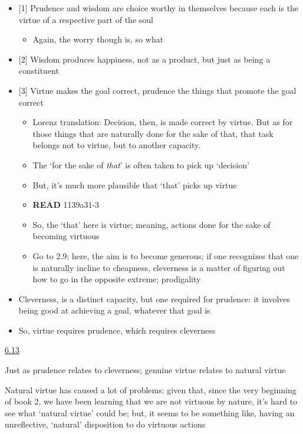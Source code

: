 \documentclass[11pt]{article}
\begin{document}
\begin{itemize}\item{[1] Prudence and wisdom are choice worthy in themselves because each is the virtue of a respective part of the soul}\begin{itemize}\item{Again, the worry though is, so what}\end{itemize}\item{[2] Wisdom produces happiness, not as a product, but just as being a constituent}\item{[3] Virtue makes the goal correct, prudence the things that promote the goal correct}\begin{itemize}\item{Lorenz translation: Decision, then, is made correct by virtue. But as for those things that are naturally done for the sake of that, that task belongs not to virtue, but to another capacity.}\item{The `for the sake of \emph{that}' is often taken to pick up `decision'}\item{But, it's much more plausible that `that' picks up virtue}\item{\textbf{READ} 1139a31-3}\item{So, the `that' here is virtue; meaning, actions done for the sake of becoming virtuous}\item{Go to 2.9; here, the aim is to become generous; if one recognizes that one is naturally incline to cheapness, cleverness is a matter of figuring out how to go in the opposite extreme; prodigality}\end{itemize}\item{Cleverness, is a distinct capacity, but one required for prudence: it involves being good at achieving a goal, whatever that goal is}\item{So, virtue requires prudence, which requires cleverness}\end{itemize}

\noindent\underline{6.13}
\vspace*{4mm}

\noindent Just as prudence relates to cleverness; genuine virtue relates to natural virtue
\vspace*{2mm}

\noindent Natural virtue has caused a lot of problems: given that, since the very beginning of book 2, we have been learning that we are not virtuous by nature, it's hard to see what `natural virtue' could be; but, it seems to be something like, having an unreflective, `natural' disposition to do virtuous actions
\vspace*{2mm}
\end{document}
